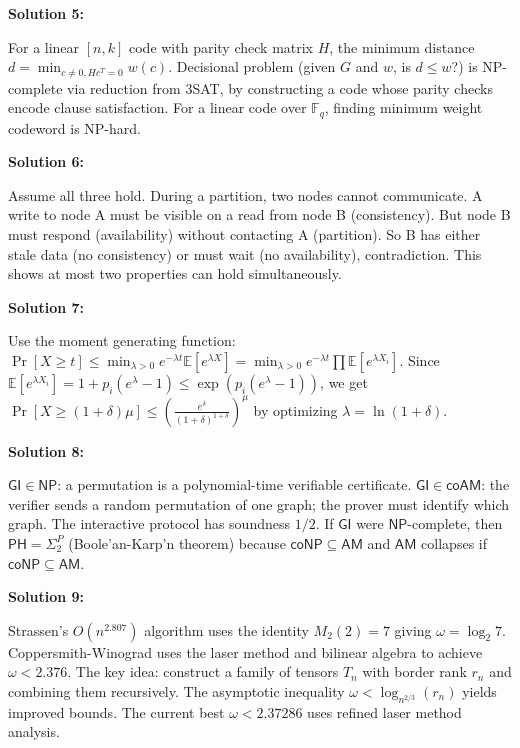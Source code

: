 \documentclass[12pt,a4paper]{exam}
\begin{document}
\textbf{Solution 5:}

For a linear $[n,k]$ code with parity check matrix $H$, the minimum distance $d = \min_{c \neq 0, Hc^T=0} w(c)$. Decisional problem (given $G$ and $w$, is $d \leq w$?) is NP-complete via reduction from 3SAT, by constructing a code whose parity checks encode clause satisfaction. For a linear code over $\mathbb{F}_q$, finding minimum weight codeword is NP-hard.

\vspace{0.5cm}

\textbf{Solution 6:}

Assume all three hold. During a partition, two nodes cannot communicate. A write to node A must be visible on a read from node B (consistency). But node B must respond (availability) without contacting A (partition). So B has either stale data (no consistency) or must wait (no availability), contradiction. This shows at most two properties can hold simultaneously.

\vspace{0.5cm}

\textbf{Solution 7:}

Use the moment generating function: $\Pr[X \geq t] \leq \min_{\lambda > 0} e^{-\lambda t} \mathbb{E}[e^{\lambda X}] = \min_{\lambda > 0} e^{-\lambda t} \prod \mathbb{E}[e^{\lambda X_i}]$. Since $\mathbb{E}[e^{\lambda X_i}] = 1 + p_i(e^\lambda - 1) \leq \exp(p_i(e^\lambda - 1))$, we get $\Pr[X \geq (1+\delta)\mu] \leq (\frac{e^\delta}{(1+\delta)^{1+\delta}})^\mu$ by optimizing $\lambda = \ln(1+\delta)$.

\vspace{0.5cm}

\textbf{Solution 8:}

$\mathsf{GI} \in \mathsf{NP}$: a permutation is a polynomial-time verifiable certificate. $\mathsf{GI} \in \mathsf{coAM}$: the verifier sends a random permutation of one graph; the prover must identify which graph. The interactive protocol has soundness $1/2$. If $\mathsf{GI}$ were $\mathsf{NP}$-complete, then $\mathsf{PH} = \Sigma_2^P$ (Boole'an-Karp'n theorem) because $\mathsf{coNP} \subseteq \mathsf{AM}$ and $\mathsf{AM}$ collapses if $\mathsf{coNP} \subseteq \mathsf{AM}$.

\vspace{0.5cm}

\textbf{Solution 9:}

Strassen's $O(n^{2.807})$ algorithm uses the identity $M_2(2) = 7$ giving $\omega = \log_2 7$. Coppersmith-Winograd uses the laser method and bilinear algebra to achieve $\omega < 2.376$. The key idea: construct a family of tensors $T_n$ with border rank $r_n$ and combining them recursively. The asymptotic inequality $\omega < \log_{n^{2/3}}(r_n)$ yields improved bounds. The current best $\omega < 2.37286$ uses refined laser method analysis.
\end{document}
